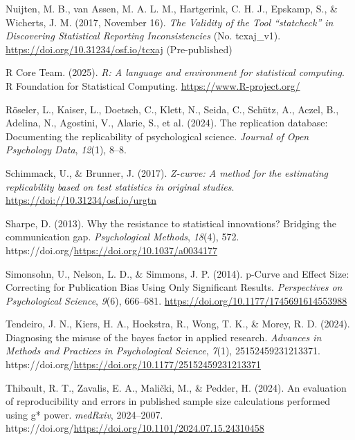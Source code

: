 \documentclass[
  letterpaper,
  12pt]{article}
\newlength{\cslhangindent}
\newenvironment{CSLReferences}[2] %
 {\begin{list}{}{%
  \setlength{\itemindent}{0pt}
  \setlength{\leftmargin}{0pt}
  \setlength{\parsep}{0pt}
  \ifodd #1
   \setlength{\leftmargin}{\cslhangindent}
   \setlength{\itemindent}{-1\cslhangindent}
  \fi
  \setlength{\itemsep}{#2\baselineskip}}}
 {\end{list}}
\begin{document}
\begin{CSLReferences}{1}{0}
Nuijten, M. B., van Assen, M. A. L. M., Hartgerink, C. H. J., Epskamp,
S., \& Wicherts, J. M. (2017, November 16). \emph{The {Validity} of the
{Tool} {``statcheck''} in {Discovering Statistical Reporting
Inconsistencies}} (No. tcxaj\_v1).
\url{https://doi.org/10.31234/osf.io/tcxaj} (Pre-published)

R Core Team. (2025). \emph{R: A language and environment for statistical
computing}. R Foundation for Statistical Computing.
\url{https://www.R-project.org/}

{Röseler, L., Kaiser, L., Doetsch, C., Klett, N., Seida, C., Schütz, A.,
Aczel, B., Adelina, N., Agostini, V., Alarie, S., et al.} (2024). The
replication database: Documenting the replicability of psychological
science. \emph{Journal of Open Psychology Data}, \emph{12}(1), 8--8.

Schimmack, U., \& Brunner, J. (2017). \emph{Z-curve: A method for the
estimating replicability based on test statistics in original studies}.
\url{https://doi://10.31234/osf.io/urgtn}

Sharpe, D. (2013). Why the resistance to statistical innovations?
Bridging the communication gap. \emph{Psychological Methods},
\emph{18}(4), 572.
https://doi.org/\url{https://doi.org/10.1037/a0034177}

Simonsohn, U., Nelson, L. D., \& Simmons, J. P. (2014). p-Curve and
Effect Size: Correcting for Publication Bias Using Only Significant
Results. \emph{Perspectives on Psychological Science}, \emph{9}(6),
666--681. \url{https://doi.org/10.1177/1745691614553988}

Tendeiro, J. N., Kiers, H. A., Hoekstra, R., Wong, T. K., \& Morey, R.
D. (2024). Diagnosing the misuse of the bayes factor in applied
research. \emph{Advances in Methods and Practices in Psychological
Science}, \emph{7}(1), 25152459231213371.
https://doi.org/\url{https://doi.org/10.1177/25152459231213371}

Thibault, R. T., Zavalis, E. A., Malički, M., \& Pedder, H. (2024). An
evaluation of reproducibility and errors in published sample size
calculations performed using g* power. \emph{medRxiv}, 2024--2007.
https://doi.org/\url{https://doi.org/10.1101/2024.07.15.24310458}


\end{CSLReferences}
\end{document}
